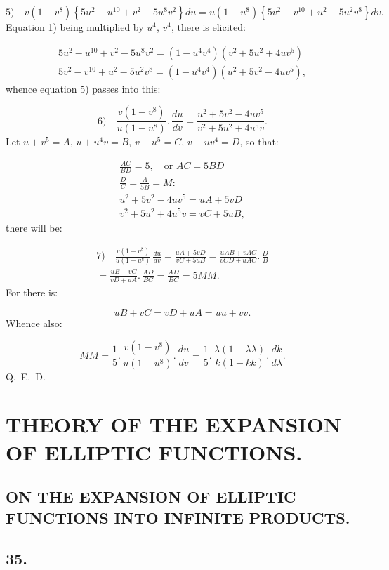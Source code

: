 \documentclass{article}
\begin{document}
\[
\text{5)}\quad v(1-v^{8})\left\{5u^{2}-u^{10}+v^{2}-5u^{8}v^{2}\right\}du=u(1-u^{8})\left\{5v^{2}-v^{10}+u^{2}-5u^{2}v^{8}\right\}dv.
\]
Equation 1) being multiplied by $u^{4}$, $v^{4}$, there is elicited:

\[
\begin{gathered}
5u^{2}-u^{10}+v^{2}-5u^{8}v^{2}=(1-u^{4}v^{4})(v^{2}+5u^{2}+4uv^{5})\\[1ex]
5v^{2}-v^{10}+u^{2}-5u^{2}v^{8}=(1-u^{4}v^{4})(u^{2}+5v^{2}-4uv^{5}),
\end{gathered}
\]
whence equation 5) passes into this:

\[
\text{6)}\quad\frac{v(1-v^{8})}{u(1-u^{8})}.\,\frac{du}{dv}=\frac{u^{2}+5v^{2}-4uv^{5}}{v^{2}+5u^{2}+4u^{5}v}.
\]
Let $u+v^{5}=A$, $u+u^{4}v=B$, $v-u^{5}=C$, $v-uv^{4}=D$, so that:

\[
\begin{gathered}
\frac{AC}{BD}=5,\quad\text{or }AC=5BD\\[1.5ex]
\frac{D}{C}=\frac{A}{5B}=M:\\[1.5ex]
u^{2}+5v^{2}-4uv^{5}=uA+5vD\\[1ex]
v^{2}+5u^{2}+4u^{5}v=vC+5uB,
\end{gathered}
\]
there will be:

\[
\begin{gathered}
\text{7)}\quad\frac{v(1-v^{8})}{u(1-u^{8})}\,\frac{du}{dv}=\frac{uA+5vD}{vC+5uB}=\frac{uAB+vAC}{vCD+uAC}.\,\frac{D}{B}\\[1.5ex]
=\frac{uB+vC}{vD+uA}.\,\frac{AD}{BC}=\frac{AD}{BC}=5MM.
\end{gathered}
\]
For there is:

\[
uB+vC=vD+uA=uu+vv.
\]
Whence also:

\[
MM=\frac{1}{5}.\,\frac{v(1-v^{8})}{u(1-u^{8})}.\,\frac{du}{dv}=\frac{1}{5}.\,\frac{\lambda(1-\lambda\lambda)}{k(1-kk)}.\,\frac{dk}{d\lambda}.
\]
Q.\ E.\ D.


\section*{THEORY OF THE EXPANSION OF ELLIPTIC FUNCTIONS.}

\subsection*{ON THE EXPANSION OF ELLIPTIC FUNCTIONS INTO INFINITE PRODUCTS.}

\subsection*{35.}
\end{document}
